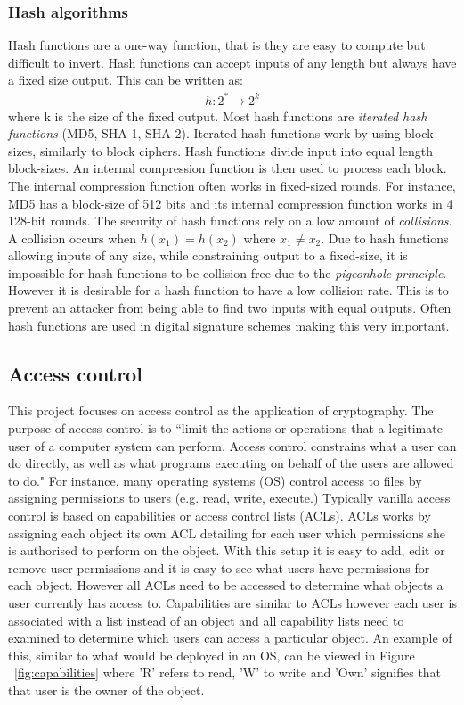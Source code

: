 \documentclass[12pt, titlepage]{article}
\begin{document}
\subsubsection*{Hash algorithms}
Hash functions are a one-way function, that is they are easy to compute but difficult to invert. Hash functions can accept inputs of any length but always have a fixed size output. This can be written as:
\begin{align*}
h: 2^* \rightarrow 2^k
\end{align*}
where k is the size of the fixed output.
\newline \indent Most hash functions are \textit{iterated hash functions} (MD5, SHA-1, SHA-2). Iterated hash functions work by using block-sizes, similarly to block ciphers. Hash functions divide input into equal length block-sizes. An internal compression function is then used to process each block. The internal compression function often works in fixed-sized rounds. For instance, MD5 has a block-size of 512 bits and its internal compression function works in 4 128-bit rounds.
\newline \indent The security of hash functions rely on a low amount of \textit{collisions}. A collision occurs when $h(x_1) = h(x_2)$ where $x_1 \neq x_2$. Due to hash functions allowing inputs of any size, while constraining output to a fixed-size, it is impossible for hash functions to be collision free due to the \textit{pigeonhole principle}. However it is desirable for a hash function to have a low collision rate. This is to prevent an attacker from being able to find two inputs with equal outputs. Often hash functions are used in digital signature schemes making this very important.

\subsection{Access control}
This project focuses on access control as the application of cryptography. The purpose of access control is to ``limit the actions or operations that a legitimate user of a computer system can perform. Access control constrains what a user can do directly, as well as what programs executing on behalf of the users are allowed to do."\cite{accessControlPrinciples} For instance, many operating systems (OS) control access to files by assigning permissions to users (e.g. read, write, execute.) Typically vanilla access control is based on capabilities or access control lists (ACLs). ACLs works by assigning each object its own ACL detailing for each user which permissions she is authorised to perform on the object. With this setup it is easy to add, edit or remove user permissions and it is easy to see what users have permissions for each object. However all ACLs need to be accessed to determine what objects a user currently has access to. Capabilities are similar to ACLs however each user is associated with a list instead of an object and all capability lists need to examined to determine which users can access a particular object. An example of this, similar to what would be deployed in an OS, can be viewed in Figure ~\ref{fig:capabilities} where 'R' refers to read, 'W' to write and 'Own' signifies that that user is the owner of the object.
\end{document}
